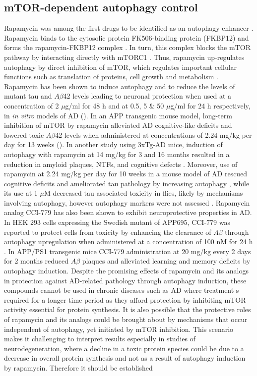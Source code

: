 \subsection{mTOR-dependent autophagy control}
Rapamycin was among the first drugs to be identified as an autophagy enhancer \citep{Blommaart1995,Noda1998}. Rapamycin binds to the cytosolic protein FK506-binding protein (FKBP12) and forms the rapamycin-FKBP12 complex \citep{Cardenas1995}. In turn, this complex blocks the mTOR pathway by interacting directly with mTORC1 \citep{Cardenas1995,Lorenz1995}. Thus, rapamycin up-regulates autophagy by direct inhibition of mTOR, which regulates important cellular functions such as translation of proteins, cell growth and metabolism \citep{Laplante2012,Polak2009}. Rapamycin has been shown to induce autophagy and to reduce the levels of mutant tau and $A\beta$42 levels leading to neuronal protection when used at a concentration of 2 $\mu$g/ml for 48 h \citep{Berger2006} and at 0.5, 5 \& 50 $\mu$g/ml for 24 h \citep{Caccamo2010} respectively, in \textit{in vitro} models of AD (). In an APP transgenic mouse model, long-term inhibition of mTOR by rapamycin alleviated AD cognitive-like deficits and lowered toxic $A\beta$42 levels when administered at concentrations of 2.24 mg/kg per day for 13 weeks \citep{Spilman2010} (). In another study using 3xTg-AD mice, induction of autophagy with rapamycin at 14 mg/kg for 3 and 16 months resulted in a reduction in amyloid plaques, NTFs, and cognitive defects  \citep{Majumder2011}. Moreover, use of rapamycin at 2.24 mg/kg per day for 10 weeks in a mouse model of AD rescued cognitive deficits and ameliorated tau pathology by increasing autophagy \citep{Caccamo2010}, while its use at 1 $\mu$M decreased tau associated toxicity in flies, likely by mechanisms involving autophagy, however autophagy markers were not assessed \citep{Berger2006}. Rapamycin analog CCI-779 has also been shown to exhibit neuroprotective properties in AD. In HEK 293 cells expressing the Swedish mutant of APP695, CCI-779 was reported to protect cells from toxicity by enhancing the clearance of $A\beta$  through autophagy upregulation when administered at a concentration of 100 nM for 24 h \citep{Jiang2014a}. In APP/PS1 transgenic mice CCI-779 administration at 20 mg/kg every 2 days for 2 months reduced $A\beta$ plaques and alleviated learning and memory deficits \citep{Jiang2014a} by autophagy induction. Despite the promising effects of rapamycin and its analogs in protection against AD-related pathology through autophagy induction, these compounds cannot be used in chronic diseases such as AD where treatment s required for a longer time period as they afford protection  by inhibiting mTOR activity essential for protein synthesis. It is also possible that the protective roles of rapamycin and its analogs could be brought about by mechanisms that occur independent of autophagy, yet initiated by mTOR inhibition. This scenario makes it challenging to interpret results especially in studies of neurodegeneration, where a decline in a toxic protein species could be due to a decrease in overall protein synthesis and not as a result of autophagy induction by rapamycin. Therefore it should be established 